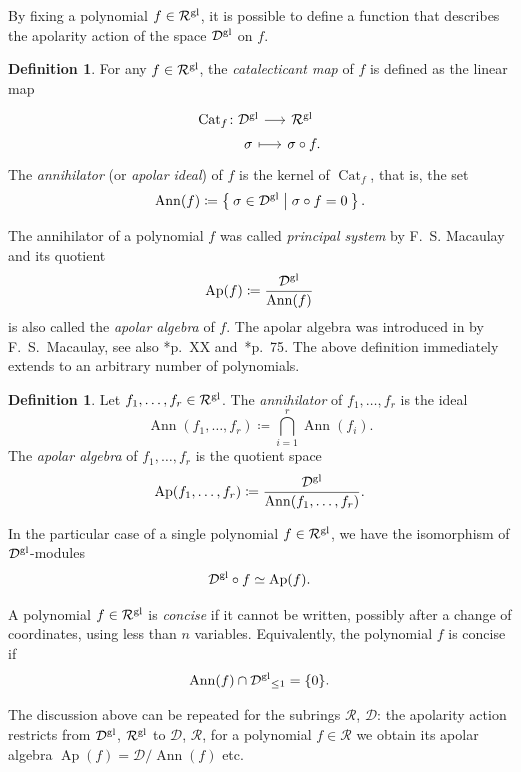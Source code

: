 \documentclass[a4paper,11pt,reqno]{amsart}
\newcommand{\calD}{\mathcal{D}}
\newcommand{\calR}{\mathcal{R}}
\DeclareMathOperator{\Ann}{Ann}
\DeclareMathOperator{\Ap}{Ap}
\DeclareMathOperator{\Cat}{Cat}
\numberwithin{equation}{section}
\theoremstyle{definition}
\newtheorem{defn}[equation]{Definition}
\theoremstyle{plain}
\theoremstyle{remark}
\newcommand{\calDgl}{\calD^{\rm{gl}}}
\newcommand{\calRgl}{\calR^{\rm{gl}}}
\begin{document}
By fixing a polynomial $f\in\calRgl$, it is possible to define a function that describes the apolarity action of the space $\calDgl$ on $f$.
\begin{defn}
For any $f\in\calRgl$, the \textit{catalecticant map} of $f$ is defined as the linear map
\begin{equation}\label{eq:catalecticant}
\begin{tikzcd}[row sep=0pt,column sep=1pc]
 \Cat_f\colon \calDgl\arrow{r} & \calRgl\hphantom{.} \\
  {\hphantom{\Cat_f\colon{}}} \sigma \arrow[mapsto]{r} & \sigma\circ f.
\end{tikzcd}
\end{equation}
The \textit{annihilator} (or \textit{apolar ideal}) of $f$ is the kernel of $\Cat_f$, that is, the set
\[
\Ann(f)\coloneq\Set{\sigma\in\calDgl|\sigma\circ f=0}.
\]
\end{defn}
The annihilator of a polynomial $f$ was called \textit{principal system} by F.~S. Macaulay and its quotient
\[
\Ap(f)\coloneq\frac{{\calDgl}}{\Ann(f)}
\]
is also called the \textit{apolar algebra} of $f$.
The apolar algebra was introduced in \cite{Mac94} by
F.~S.~Macaulay, see also \cite{IK99}*{p.~XX} and~\cite{Dol12}*{p.~75}.
The above definition immediately extends to an arbitrary number of polynomials.
\begin{defn}
Let $f_1,\dots,f_r\in\calRgl$. The \textit{annihilator} of $f_1,\dots,f_r$ is the ideal
\[
\Ann(f_1,\dots,f_r)\coloneq\bigcap_{i=1}^r\Ann(f_i).
\]
The \textit{apolar algebra} of $f_1,\dots,f_r$ is the quotient space
\[
\Ap(f_1,\dots,f_r)\coloneq\frac{{\calDgl}}{\Ann(f_1,\dots,f_r)}.
\]
\end{defn}
In the particular case of a single polynomial $f\in\calRgl$, we have the
isomorphism of $\calDgl$-modules
\begin{equation}\label{eq:apolarIso}
\calDgl\circ f\simeq\Ap(f).
\end{equation}


A polynomial {$f\in \calRgl$} is \emph{concise} if it
cannot be written, possibly after a change of coordinates, using less than $n$ variables. Equivalently, the polynomial $f$ is concise if \[\Ann(f)\cap
{\calDgl}_{\leq 1} = \{0\}.\]

{The discussion above can be repeated for the subrings $\calR$, $\calD$: the apolarity action restricts from $\calDgl$, $\calRgl$ to $\calD$, $\calR$, for a polynomial $f\in\calR$ we obtain its apolar algebra $\Ap(f) = \calD/\Ann(f)$ etc.}
\end{document}

